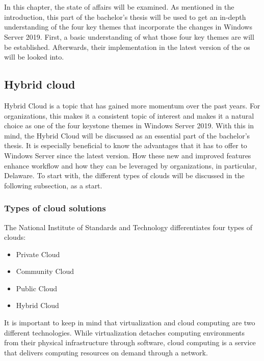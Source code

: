 \chapter{}
\label{ch:stand-van-zaken}
In this chapter, the state of affairs will be examined. As mentioned in the introduction, this part of the bachelor's thesis will be used to get an in-depth understanding of the four key themes that incorporate the changes in Windows Server 2019. First, a basic understanding of what those four key themes are will be established. Afterwards, their implementation in the latest version of the \acrshort{os} will be looked into.

\section{Hybrid cloud}
Hybrid Cloud is a topic that has gained more momentum over the past years. For organizations, this makes it a consistent topic of interest and makes it a natural choice as one of the four keystone themes in Windows Server 2019.\autocite{MWST2018} With this in mind, the Hybrid Cloud will be discussed as an essential part of the bachelor's thesis. It is especially beneficial to know the advantages that it has to offer to Windows Server since the latest version. How these new and improved features enhance workflow and how they can be leveraged by organizations, in particular, Delaware. To start with, the different types of clouds will be discussed in the following subsection, as a start.

\subsection{Types of cloud solutions}
The National Institute of Standards and Technology differentiates four types of clouds\autocite{Mell2011}:
\begin{itemize}
	\item Private Cloud
	\item Community Cloud
	\item Public Cloud
	\item Hybrid Cloud
\end{itemize}	
It is important to keep in mind that virtualization and cloud computing are two different technologies. While virtualization detaches computing environments from their physical infrastructure through software, cloud computing is a service that delivers computing resources on demand through a network.\autocite{Naeem2016}

